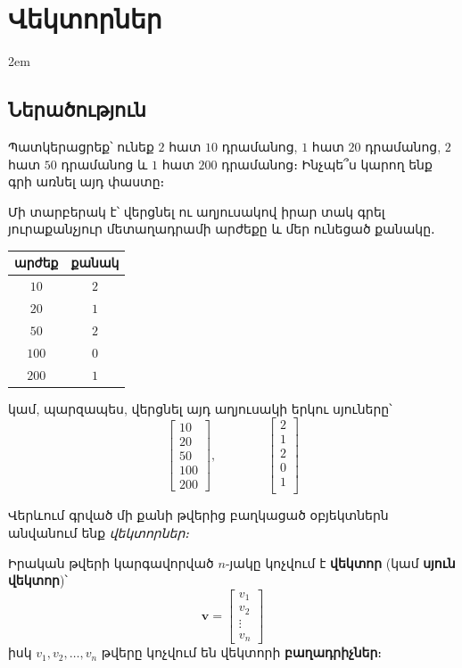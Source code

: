 \setchapterpreamble[u]{\margintoc}
\chapter{Վեկտորներ}

\emergencystretch 2em

\section{Ներածություն}

Պատկերացրեք՝ ունեք $2$ հատ $10$ դրամանոց, $1$ հատ $20$ դրամանոց, $2$ հատ $50$ դրամանոց և $1$ հատ $200$ դրամանոց։ Ինչպե՞ս կարող ենք գրի առնել այդ փաստը։

Մի տարբերակ է՝ վերցնել ու աղյուսակով իրար տակ գրել յուրաքանչյուր մետաղադրամի արժեքը և մեր ունեցած քանակը․%
\begin{table}[h]
  \raggedright
  \begin{tabular}{|c|c|}
    \hline
    \textbf{արժեք} & \textbf{քանակ} \\
    \hline
    $10$ & $2$\\
    \hline
    $20$ & $1$\\
    \hline
    $50$ & $2$ \\
    \hline
    $100$ & $0$ \\
    \hline
    $200$ & $1$ \\
    \hline
  \end{tabular}
\end{table}

կամ, պարզապես, վերցնել այդ աղյուսակի երկու սյուները՝
\[
\begin{bmatrix}
10 \\ 20 \\ 50 \\ 100 \\ 200
\end{bmatrix}, \qquad \qquad \begin{bmatrix}
2 \\1 \\2 \\0 \\1 \\
\end{bmatrix}
\]

Վերևում գրված մի քանի թվերից բաղկացած օբյեկտներն անվանում ենք \textit{վեկտորներ։}

\begin{definition}
Իրական թվերի կարգավորված $n$-յակը կոչվում է \textbf{վեկտոր} (կամ \textbf{սյուն վեկտոր})՝
\[
\mathbf{v} = \begin{bmatrix} v_1 \\ v_2 \\ \vdots \\ v_n \end{bmatrix}
\]
իսկ \( v_1, v_2, \ldots, v_n \) թվերը կոչվում են վեկտորի \textbf{բաղադրիչներ}։
\end{definition}

